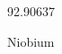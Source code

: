 \documentclass[12pt]{article}
\begin{document}
\hfill{}
\vfill
\begin{center}
  {\fontsize{50}{60}
  }

  \vspace{1em}

  92.90637

Niobium
\end{center}
\vfill
\end{document}

